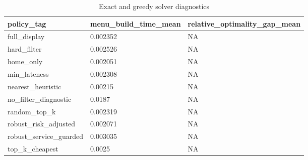 \begin{table}[ht]
\centering
\begin{tabular}{lll}
 \hline
policy\_tag & menu\_build\_time\_mean & relative\_optimality\_gap\_mean \\
 \hline
full\_display & 0.002352 & NA \\
hard\_filter & 0.002526 & NA \\
home\_only & 0.002051 & NA \\
min\_lateness & 0.002308 & NA \\
nearest\_heuristic & 0.00215 & NA \\
no\_filter\_diagnostic & 0.0187 & NA \\
random\_top\_k & 0.002319 & NA \\
robust\_risk\_adjusted & 0.002071 & NA \\
robust\_service\_guarded & 0.003035 & NA \\
top\_k\_cheapest & 0.0025 & NA \\
 \hline
\end{tabular}
\caption{Exact and greedy solver diagnostics}
\end{table}
